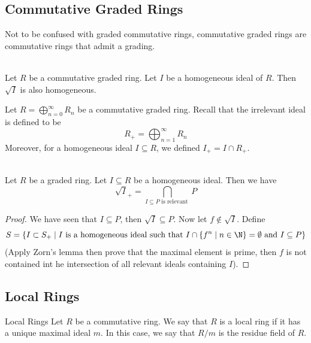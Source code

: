 \documentclass[a4paper]{article}
\begin{document}
\subsection{Commutative Graded Rings}
Not to be confused with graded commutative rings, commutative graded rings are commutative rings that admit a grading. 

\begin{lmm}{}{}\\
Let $R$ be a commutative graded ring. Let $I$ be a homogeneous ideal of $R$. Then $\sqrt{I}$ is also homogeneous. 
\end{lmm}

Let $R=\bigoplus_{n=0}^\infty R_n$ be a commutative graded ring. Recall that the irrelevant ideal is defined to be $$R_+=\bigoplus_{n=1}^\infty R_n$$ Moreover, for a homogeneous ideal $I\subseteq R$, we defined $I_+=I\cap R_+$. 

\begin{lmm}{}{}\\
Let $R$ be a graded ring. Let $I\subseteq R$ be a homogeneous ideal. Then we have $$\sqrt{I}_+=\bigcap_{I\subseteq P\text{ is relevant }}P$$
\begin{proof}
We have seen that $I\subseteq P$, then $\sqrt{I}\subseteq P$. Now let $f\notin\sqrt{I}$. Define $$S=\{I\subset S_+\;|\;I\text{ is a homogeneous ideal such that }I\cap\{f^n\;|\;n\in\N\}=\emptyset\text{ and }I\subseteq P\}$$ (Apply Zorn's lemma then prove that the maximal element is prime, then $f$ is not contained int he intersection of all relevant ideals containing $I$). 
\end{proof}
\end{lmm}

\subsection{Local Rings}
\begin{defn}{Local Rings}{} Let $R$ be a commutative ring. We say that $R$ is a local ring if it has a unique maximal ideal $m$. In this case, we say that $R/m$ is the residue field of $R$. 
\end{defn}
\end{document}
